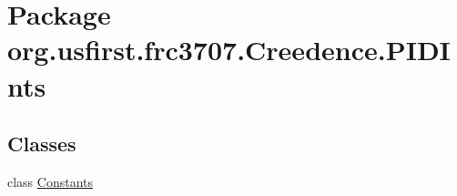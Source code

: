 \hypertarget{namespaceorg_1_1usfirst_1_1frc3707_1_1_creedence_1_1_p_i_d_ints}{}\section{Package org.\+usfirst.\+frc3707.\+Creedence.\+P\+I\+D\+Ints}
\label{namespaceorg_1_1usfirst_1_1frc3707_1_1_creedence_1_1_p_i_d_ints}
\subsection*{Classes}
\begin{DoxyCompactItemize}
\item 
class \mbox{\hyperlink{classorg_1_1usfirst_1_1frc3707_1_1_creedence_1_1_p_i_d_ints_1_1_constants}{Constants}}
\end{DoxyCompactItemize}
